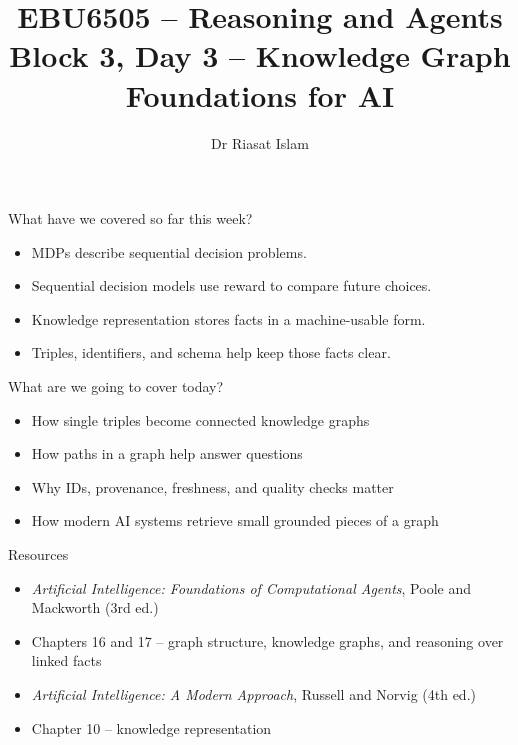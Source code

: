 \documentclass[aspectratio=169]{beamer}
\title[EBU6505 B3 D3]{EBU6505 -- Reasoning and Agents\\Block 3, Day 3 -- Knowledge Graph Foundations for AI}
\author{Dr Riasat Islam}
\institute{Queen Mary University of London}
\date{}
\newcommand{\defaultdeckrefs}{AIMA4e Ch.10 pp.314--343; Poole3e Ch.16--17 pp.701--766}
\newcommand{\currentsliderefs}{\defaultdeckrefs}
\newcommand{\setslideref}[1]{\gdef\currentsliderefs{#1}}
\begin{document}
\setslideref{AIMA4e Ch.10 pp.314--343; Poole3e Ch.16--17 pp.701--766}
\begin{frame}
  \titlepage
\end{frame}

\begin{frame}{What have we covered so far this week?}
\begin{itemize}
  \item MDPs describe sequential decision problems.
  \item Sequential decision models use reward to compare future choices.
  \item Knowledge representation stores facts in a machine-usable form.
  \item Triples, identifiers, and schema help keep those facts clear.
\end{itemize}
\end{frame}

\begin{frame}{What are we going to cover today?}
\begin{itemize}
  \item How single triples become connected knowledge graphs
  \item How paths in a graph help answer questions
  \item Why IDs, provenance, freshness, and quality checks matter
  \item How modern AI systems retrieve small grounded pieces of a graph
\end{itemize}
\end{frame}

\begin{frame}{Resources}
\begin{itemize}
  \item \textit{Artificial Intelligence: Foundations of Computational Agents}, Poole and Mackworth (3rd ed.)
  \item Chapters 16 and 17 -- graph structure, knowledge graphs, and reasoning over linked facts
  \item \textit{Artificial Intelligence: A Modern Approach}, Russell and Norvig (4th ed.)
  \item Chapter 10 -- knowledge representation
\end{itemize}
\end{frame}
\end{document}
